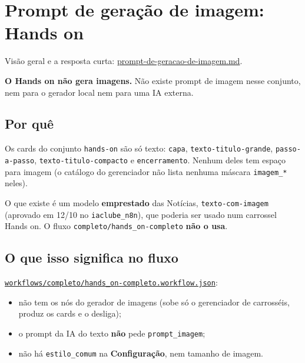 
\section{Prompt de geração de imagem: Hands on}\label{sec:hands-on}

Visão geral e a resposta curta: \hyperref[sec:visao-geral]{prompt-de-geracao-de-imagem.md}.

\textbf{O Hands on não gera imagens.} Não existe prompt de imagem nesse conjunto, nem para o gerador local nem para uma IA externa.

\subsection*{Por quê}

Os cards do conjunto \nolinkurl{hands-on} são só texto: \texttt{capa}, \nolinkurl{texto-titulo-grande}, \nolinkurl{passo-a-passo}, \nolinkurl{texto-titulo-compacto} e \texttt{encerramento}. Nenhum deles tem espaço para imagem (o catálogo do gerenciador não lista nenhuma máscara \nolinkurl{imagem_*} neles).

O que existe é um modelo \textbf{emprestado} das Notícias, \nolinkurl{texto-com-imagem} (aprovado em 12/10 no \nolinkurl{iaclube_n8n}), que poderia ser usado num carrossel Hands on. O fluxo \nolinkurl{completo/hands_on-completo} \textbf{não o usa}.

\subsection*{O que isso significa no fluxo}

\href{run:../../../workflows/completo/hands_on-completo.workflow.json}{\nolinkurl{workflows/completo/hands_on-completo.workflow.json}}:

\begin{itemize}
\item 
não tem os nós do gerador de imagens (sobe só o gerenciador de carrosséis, produz os cards e o desliga);


\item 
o prompt da IA do texto \textbf{não} pede \nolinkurl{prompt_imagem};


\item 
não há \nolinkurl{estilo_comum} na \textbf{Configuração}, nem tamanho de imagem.


\end{itemize}

